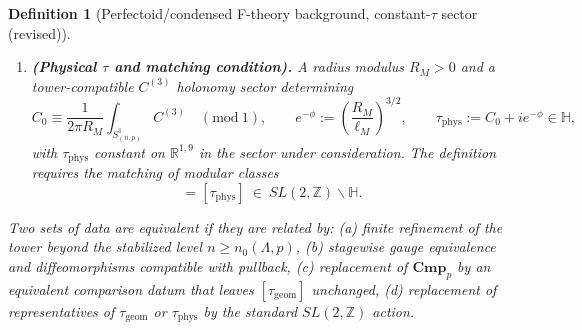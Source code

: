 \documentclass[11pt]{article}
\newtheorem{definition}[theorem]{Definition}
\theoremstyle{remark}
\begin{document}
\begin{definition}[Perfectoid/condensed F-theory background, constant-$\tau$ sector (revised)]
\begin{enumerate}
\item \textbf{(Physical $\tau$ and matching condition).}
A radius modulus $R_M>0$ and a tower-compatible $C^{(3)}$ holonomy sector determining
\begin{equation}
C_0 \equiv \frac{1}{2\pi R_M}\int_{S^{1}_{(n,p)}} C^{(3)} \quad (\mathrm{mod}\ 1),
\qquad e^{-\phi} := \left(\frac{R_M}{\ell_M}\right)^{3/2},
\qquad \tau_{\mathrm{phys}} := C_0 + i e^{-\phi}\in\mathbb{H},
\end{equation}
with $\tau_{\mathrm{phys}}$ constant on $\mathbb{R}^{1,9}$ in the sector under consideration.
The definition requires the \emph{matching} of modular classes
\begin{equation}
[\tau_{\mathrm{geom}}] = [\tau_{\mathrm{phys}}]\ \in\ SL(2,\mathbb{Z})\backslash \mathbb{H}.
\end{equation}
\end{enumerate}

Two sets of data are equivalent if they are related by:
(a) finite refinement of the tower beyond the stabilized level $n\ge n_0(\Lambda,p)$,
(b) stagewise gauge equivalence and diffeomorphisms compatible with pullback,
(c) replacement of $\mathbf{Cmp}_p$ by an equivalent comparison datum that leaves $[\tau_{\mathrm{geom}}]$ unchanged,
(d) replacement of representatives of $\tau_{\mathrm{geom}}$ or $\tau_{\mathrm{phys}}$ by the standard $SL(2,\mathbb{Z})$ action.
\end{definition}
\end{document}
